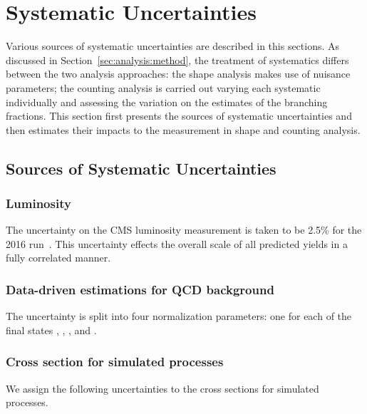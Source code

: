 \section{Systematic Uncertainties}
\label{sec:analysis:systematics}


Various sources of systematic uncertainties are described in this sections. As discussed in Section~\ref{sec:analysis:method}, the treatment of systematics differs between the two analysis approaches: the shape analysis makes use of nuisance parameters; the counting analysis is carried out varying each systematic individually and assessing the variation on the estimates of the branching fractions. This section first presents the sources of systematic uncertainties and then estimates their impacts to the measurement in shape and counting analysis.


\subsection{Sources of Systematic Uncertainties}
\label{sec:analysis:systematics:source}


\subsubsection{Luminosity} 
The uncertainty on the CMS luminosity measurement is taken to be 2.5\% for the 2016 run~\cite{CMS-PAS-LUM-17-001}.  This uncertainty effects the overall scale of all predicted yields in a fully correlated manner. 


\subsubsection{Data-driven estimations for QCD background}

The uncertainty is split into four normalization parameters: one for each of the final states \cet, \cmt, \ceh, and \cmh.  

\subsubsection{Cross section for simulated processes} 

We assign the following uncertainties to the cross sections for simulated processes.

